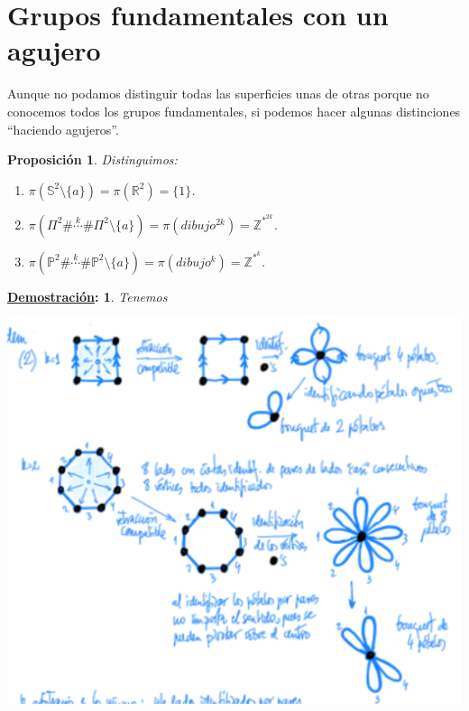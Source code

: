 \documentclass[10pt,a4paper,openright]{book}
\theoremstyle{break}
\newtheorem*{prop}{Proposición}
\newtheorem*{demo}{\underline{Demostración}:}
\begin{document}
\section{Grupos fundamentales con un agujero}%
\label{sec:grupos_fundamentales_con_un_agujero}
Aunque no podamos distinguir todas las superficies unas de otras porque no conocemos todos los grupos fundamentales, si podemos hacer algunas distinciones ``haciendo agujeros''.

\begin{prop}
Distinguimos:
\begin{enumerate}
    \item $\pi\left( \mathbb{S}^{2} \setminus \{a\} \right) = \pi\left( \mathbb{R}^{2} \right) = \{1\}$.
    \item $\pi\left( \Pi^2 \# \stackrel{k}{\cdots} \# \Pi^2 \setminus \{a\} \right) = \pi\left( dibujo^{2k}  \right) = \mathbb{Z}^{*^{2k}}$.
    \item $\pi\left( \mathbb{P}^{2} \# \stackrel{k}{\cdots} \# \mathbb{P}^{2} \setminus \{a\} \right) = \pi\left( dibujo^{k} \right) = \mathbb{Z}^{*^{k}}$.
\end{enumerate}
\end{prop}
\begin{demo}
Tenemos
\begin{center}
    \includegraphics[scale=0.3]{images/dem_grupos_fund_agujeros} 
\end{center}
\end{demo}
\end{document}
